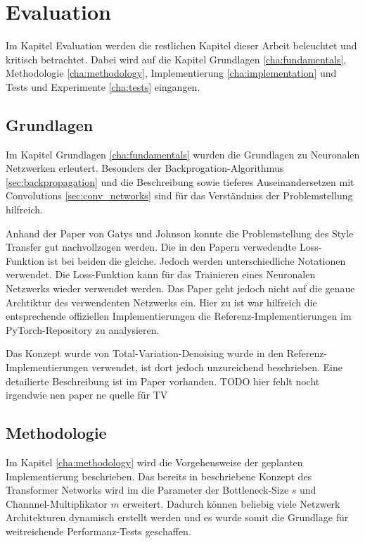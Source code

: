 \chapter{Evaluation}

Im Kapitel Evaluation werden die restlichen Kapitel dieser Arbeit beleuchtet und kritisch betrachtet. Dabei wird auf die Kapitel Grundlagen \ref{cha:fundamentals}, Methodologie \ref{cha:methodology}, Implementierung \ref{cha:implementation} und Tests und Experimente \ref{cha:tests} eingangen.

\section{Grundlagen}

Im Kapitel Grundlagen \ref{cha:fundamentals} wurden die Grundlagen zu Neuronalen Netzwerken erleutert. Besonders der Backprogation-Algorithmus \ref{sec:backpropagation} und die Beschreibung sowie tieferes Auseinandersetzen mit Convolutions \ref{sec:conv_networks} sind für das Verständniss der Problemstellung hilfreich.

Anhand der Paper von Gatys \cite{DBLP:journals/corr/GatysEB15a} und Johnson \cite{DBLP:journals/corr/JohnsonAL16} konnte die Problemstellung des Style Transfer gut nachvollzogen werden. Die in den Papern verwedendte Loss-Funktion ist bei beiden die gleiche. Jedoch werden unterschiedliche Notationen verwendet.
Die Loss-Funktion kann für das Trainieren eines Neuronalen Netzwerks wieder verwendet werden. Das Paper \cite{DBLP:journals/corr/JohnsonAL16} geht jedoch nicht auf die genaue Archtiktur des verwendenten Netzwerks ein. Hier zu ist war hilfreich die entsprechende offiziellen Implementierungen die Referenz-Implementierungen im PyTorch-Repository zu analysieren.

Das Konzept wurde von Total-Variation-Denoising wurde in den Referenz-Implementierungen verwendet, ist dort jedoch unzureichend beschrieben. Eine detailierte Beschreibung ist im Paper \cite{Rudin1992NonlinearTV} vorhanden. TODO hier fehlt nocht irgendwie nen paper ne quelle für TV

\section{Methodologie}

Im Kapitel \ref{cha:methodology} wird die Vorgehensweise der geplanten Implementierung beschrieben. Das bereits in \cite{DBLP:journals/corr/JohnsonAL16} beschriebene Konzept des Transformer Networks wird im die Parameter der Bottleneck-Size $ s $ und Channnel-Multiplikator $ m $ erweitert. Dadurch können beliebig viele Netzwerk Architekturen dynamisch erstellt werden und es wurde somit die Grundlage für weitreichende Performanz-Tests geschaffen.

